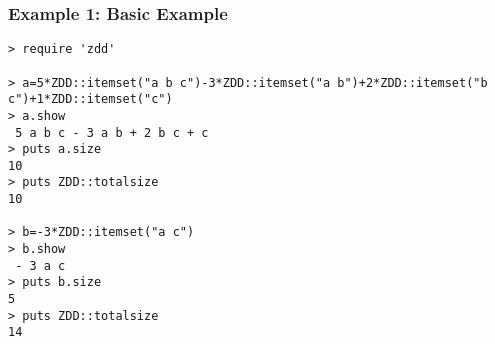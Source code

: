 \subsubsection*{Example 1: Basic Example}



\begin{Verbatim}[baselinestretch=0.7,frame=single]
> require 'zdd'

> a=5*ZDD::itemset("a b c")-3*ZDD::itemset("a b")+2*ZDD::itemset("b c")+1*ZDD::itemset("c")
> a.show
 5 a b c - 3 a b + 2 b c + c
> puts a.size
10
> puts ZDD::totalsize
10

> b=-3*ZDD::itemset("a c")
> b.show
 - 3 a c
> puts b.size
5
> puts ZDD::totalsize
14
\end{Verbatim}
